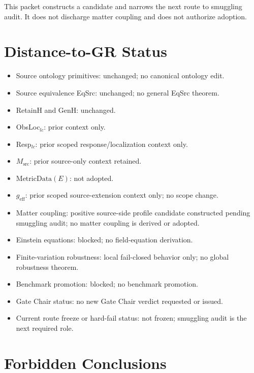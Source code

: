 \documentclass[11pt]{article}
\newcommand{\MetricData}{\mathrm{MetricData}}
\newcommand{\geff}{g_{\mathrm{eff}}}
\begin{document}
This packet constructs a candidate and narrows the next route to smuggling
audit. It does not discharge matter coupling and does not authorize adoption.

\section{Distance-to-GR Status}

\begin{itemize}[leftmargin=*]
  \item Source ontology primitives: unchanged; no canonical ontology edit.
  \item Source equivalence EqSrc: unchanged; no general EqSrc theorem.
  \item RetainH and GenH: unchanged.
  \item ObsLoc\(_{lc}\): prior context only.
  \item Resp\(_{lc}\): prior scoped response/localization context only.
  \item \(M_{\mathrm{src}}\): prior source-only context retained.
  \item \(\MetricData(E)\): not adopted.
  \item \(\geff\): prior scoped source-extension context only; no scope
  change.
  \item Matter coupling: positive source-side profile candidate constructed
  pending smuggling audit; no matter coupling is derived or adopted.
  \item Einstein equations: blocked; no field-equation derivation.
  \item Finite-variation robustness: local fail-closed behavior only; no
  global robustness theorem.
  \item Benchmark promotion: blocked; no benchmark promotion.
  \item Gate Chair status: no new Gate Chair verdict requested or issued.
  \item Current route freeze or hard-fail status: not frozen; smuggling audit
  is the next required role.
\end{itemize}

\section{Forbidden Conclusions}
\end{document}
